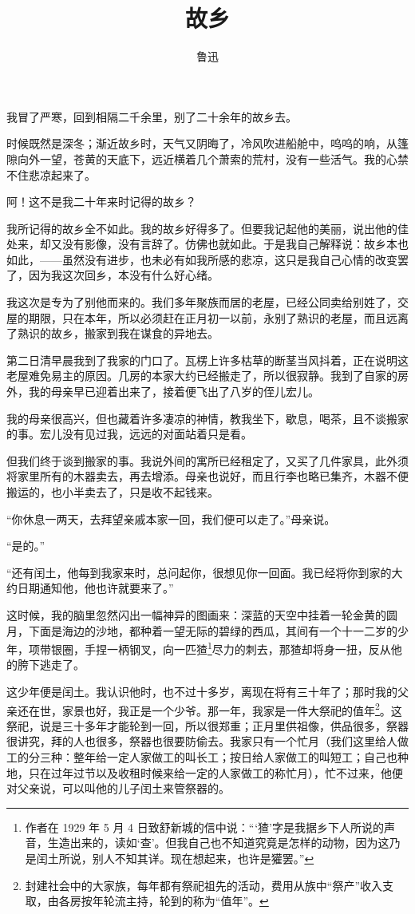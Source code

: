 \documentclass[12pt,UTF8]{ctexbook}
\title{\heiti\zihao{0} 故乡}
\author{鲁迅}
\date{}
\begin{document}
\maketitle
\tableofcontents

\frontmatter

我冒了严寒，回到相隔二千余里，别了二十余年的故乡去。

时候既然是深冬；渐近故乡时，天气又阴晦了，冷风吹进船舱中，呜呜的响，从篷隙向外一望，苍黄的天底下，远近横着几个萧索的荒村，没有一些活气。我的心禁不住悲凉起来了。

阿！这不是我二十年来时记得的故乡？

我所记得的故乡全不如此。我的故乡好得多了。但要我记起他的美丽，说出他的佳处来，却又没有影像，没有言辞了。仿佛也就如此。于是我自己解释说：故乡本也如此，——虽然没有进步，也未必有如我所感的悲凉，这只是我自己心情的改变罢了，因为我这次回乡，本没有什么好心绪。

我这次是专为了别他而来的。我们多年聚族而居的老屋，已经公同卖给别姓了，交屋的期限，只在本年，所以必须赶在正月初一以前，永别了熟识的老屋，而且远离了熟识的故乡，搬家到我在谋食的异地去。

第二日清早晨我到了我家的门口了。瓦楞上许多枯草的断茎当风抖着，正在说明这老屋难免易主的原因。几房的本家大约已经搬走了，所以很寂静。我到了自家的房外，我的母亲早已迎着出来了，接着便飞出了八岁的侄儿宏儿。

我的母亲很高兴，但也藏着许多凄凉的神情，教我坐下，歇息，喝茶，且不谈搬家的事。宏儿没有见过我，远远的对面站着只是看。

但我们终于谈到搬家的事。我说外间的寓所已经租定了，又买了几件家具，此外须将家里所有的木器卖去，再去增添。母亲也说好，而且行李也略已集齐，木器不便搬运的，也小半卖去了，只是收不起钱来。

“你休息一两天，去拜望亲戚本家一回，我们便可以走了。”母亲说。

“是的。”

“还有闰土，他每到我家来时，总问起你，很想见你一回面。我已经将你到家的大约日期通知他，他也许就要来了。”

这时候，我的脑里忽然闪出一幅神异的图画来：深蓝的天空中挂着一轮金黄的圆月，下面是海边的沙地，都种着一望无际的碧绿的西瓜，其间有一个十一二岁的少年，项带银圈，手捏一柄钢叉，向一匹猹\footnote{作者在 1929 年 5 月 4 日致舒新城的信中说：“‘猹’字是我据乡下人所说的声音，生造出来的，读如‘查’。但我自己也不知道究竟是怎样的动物，因为这乃是闰土所说，别人不知其详。现在想起来，也许是獾罢。”}尽力的刺去，那猹却将身一扭，反从他的胯下逃走了。

这少年便是闰土。我认识他时，也不过十多岁，离现在将有三十年了；那时我的父亲还在世，家景也好，我正是一个少爷。那一年，我家是一件大祭祀的值年\footnote{封建社会中的大家族，每年都有祭祀祖先的活动，费用从族中“祭产”收入支取，由各房按年轮流主持，轮到的称为“值年”。}。这祭祀，说是三十多年才能轮到一回，所以很郑重；正月里供祖像，供品很多，祭器很讲究，拜的人也很多，祭器也很要防偷去。我家只有一个忙月（我们这里给人做工的分三种：整年给一定人家做工的叫长工；按日给人家做工的叫短工；自己也种地，只在过年过节以及收租时候来给一定的人家做工的称忙月），忙不过来，他便对父亲说，可以叫他的儿子闰土来管祭器的。
\end{document}
